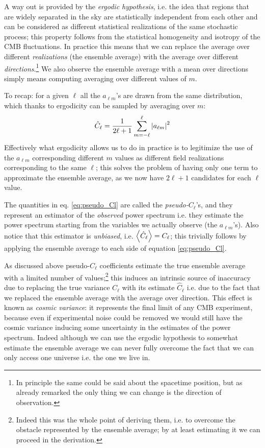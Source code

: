 A way out is provided by the \emph{ergodic hypothesis}, i.e. the idea that regions that are widely separated in the sky are statistically independent from each other and can be considered as different statistical realizations of the same stochastic process; this property follows from the statistical homogeneity and isotropy of the CMB fluctuations. In practice this means that we can replace the average over different \emph{realizations} (the ensemble average) with the average over different \emph{directions}.\footnote{In principle the same could be said about the spacetime position, but as already remarked the only thing we can change is the direction of observation.}
We also observe the ensemble average with a mean over directions simply means computing averaging over different values of $m$.

To recap: for a given $\ell$ all the $a_{\ell m}$'s are drawn from the same distribution, which thanks to ergodicity can be sampled by averaging over $m$:
\begin{equation}
\label{eq:pseudo_Cl}
    \hat{C}_\ell = \frac{1}{2\ell+1}\sum_{m=-\ell}^\ell \abs{a_{\ell m}}^2
\end{equation}
Effectively what ergodicity allows us to do in practice is to legitimize the use of the $a_{\ell m}$ corresponding different $m$ values as different field realizations corresponding to the same $\ell$; this solves the problem of having only one term to approximate the ensemble average, as we now have $2\ell+1$ candidates for each $\ell$ value.

The quantities in eq. \eqref{eq:pseudo_Cl} are called the \emph{pseudo-$C_\ell$}'s, and they represent an estimator of the \emph{observed} power spectrum i.e. they estimate the power spectrum starting from the variables we actually observe (the $a_{\ell m}$'s). Also notice that this estimator is \emph{unbiased}, i.e. $\expval{\hat{C}_\ell} = C_\ell$; this trivially follows by applying the ensemble average to each side of equation \eqref{eq:pseudo_Cl}.

As discussed above pseudo-$C_\ell$ coefficients estimate the true ensemble average with a limited number of values;\footnote{Indeed this was the whole point of deriving them, i.e. to overcome the obstacle represented by the ensemble average; by at least estimating it we can proceed in the derivation.} this induces an intrinsic source of inaccuracy due to replacing the true variance $C_\ell$ with its estimate $\hat{C}_\ell$ i.e. due to the fact that we replaced the ensemble average with the average over direction. This effect is known as \emph{cosmic variance}: it represents the final limit of any CMB experiment, because even if experimental noise could be removed we would still have the cosmic variance inducing some uncertainty in the estimates of the power spectrum. Indeed although we can use the ergodic hypothesis to somewhat estimate the ensemble average we can never fully overcome the fact that we can only access one universe i.e. the one we live in.


